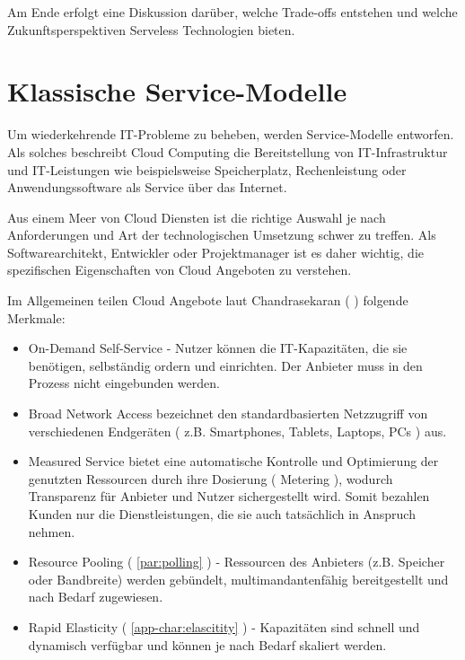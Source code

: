 \documentclass[
12pt,
english,
ngerman,
headsepline,
twoside,
openright,
numbers=noenddot,version=first
]{scrreprt}
\begin{document}
Am Ende erfolgt eine Diskussion darüber, welche Trade-offs entstehen und welche Zukunftsperspektiven Serveless Technologien bieten.


\chapter{Klassische Service-Modelle}
\label{chap:service-models}
\label{chap:principles}

Um wiederkehrende IT-Probleme zu beheben, werden Service-Modelle entworfen. Als solches beschreibt
Cloud Computing die Bereitstellung von IT-Infrastruktur und IT-Leistungen wie beispielsweise Speicherplatz, Rechenleistung oder Anwendungssoftware als Service über das Internet.\cite{cloudEssentials}

\label{sec:cloud-char}
Aus einem Meer von Cloud Diensten ist die richtige Auswahl je nach Anforderungen und Art der technologischen Umsetzung schwer zu treffen. Als Softwarearchitekt, Entwickler oder Projektmanager ist es daher wichtig, die spezifischen Eigenschaften von Cloud Angeboten zu verstehen. 


Im Allgemeinen teilen Cloud Angebote laut Chandrasekaran ( \cite{cloudEssentials} ) folgende Merkmale:
\begin{itemize}
	\item On-Demand Self-Service - Nutzer können die IT-Kapazitäten, die sie benötigen, selbständig ordern und einrichten. Der Anbieter muss in den Prozess nicht eingebunden werden.
	\item Broad Network Access bezeichnet den standardbasierten Netzzugriff von verschiedenen Endgeräten ( z.B. Smartphones, Tablets, Laptops, PCs ) aus.
	\item Measured Service bietet eine automatische Kontrolle und Optimierung der genutzten Ressourcen durch ihre Dosierung ( Metering ), wodurch Transparenz für Anbieter und Nutzer sichergestellt wird. Somit bezahlen Kunden nur die Dienstleistungen, die sie auch tatsächlich in Anspruch nehmen.
	\item Resource Pooling ( \ref{par:polling} ) - Ressourcen des Anbieters (z.B. Speicher oder Bandbreite) werden gebündelt, multimandantenfähig bereitgestellt und nach Bedarf zugewiesen.
	\item Rapid Elasticity ( \autoref{app-char:elascitity} ) - Kapazitäten sind schnell und dynamisch verfügbar und können je nach Bedarf skaliert werden.
\end{itemize}
\end{document}
